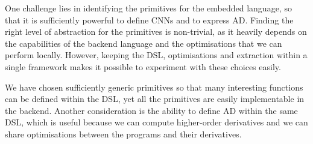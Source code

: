 One challenge lies in identifying the primitives for the embedded language,
so that it is sufficiently powerful to define CNNs and to express AD.
Finding the right level of abstraction for the primitives is non-trivial,
as it heavily depends on the capabilities of the backend language and the
optimisations that we can perform locally.  However, keeping the DSL,
optimisations and extraction within a single framework makes it possible
to experiment with these choices easily.


We have chosen sufficiently generic primitives so that many interesting
functions can be defined within the DSL, yet all the primitives are easily
implementable in the backend.  Another consideration is the ability to define
AD within the same DSL, which is useful because we can compute higher-order
derivatives and we can share optimisations between the programs and their
derivatives.
\begin{code}[hide]%
\>[0]\AgdaSpace{}%
\AgdaSpace{}%
\<%
\\
\>[0][@{}l@{\AgdaIndent{0}}]%
\>[2]\<%
\\
%
\>[2]\AgdaSpace{}%
\AgdaSpace{}%
\AgdaSpace{}%
\AgdaSpace{}%
\AgdaSymbol{(}\AgdaSymbol{;}\AgdaSpace{}%
\AgdaSymbol{;}\AgdaSpace{}%
\AgdaSymbol{)}\<%
\\
%
\>[2]\AgdaSpace{}%
\AgdaSpace{}%
\<%
\\
%
\>[2]\AgdaSpace{}%
\AgdaSpace{}%
\<%
\\
\>[2][@{}l@{\AgdaIndent{0}}]%
\>[4]\AgdaSpace{}%
\AgdaSpace{}%
\<%
\\
%
\>[4]\AgdaSpace{}%
\AgdaSpace{}%
\<%
\\
%
\\[\AgdaEmptyExtraSkip]%
%
\>[2]\AgdaSpace{}%
\AgdaSpace{}%
\AgdaSpace{}%
\AgdaSymbol{(}\AgdaSymbol{;}\AgdaSpace{}%
\AgdaSymbol{;}\AgdaSpace{}%
\AgdaSymbol{;}\AgdaSpace{}%
\AgdaSymbol{;}\AgdaSpace{}%
\AgdaSymbol{;}\AgdaSpace{}%
\AgdaSymbol{)}\<%
\\
\>[0]\<%
\end{code}

